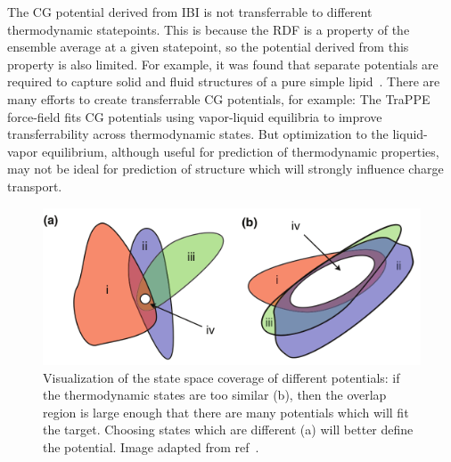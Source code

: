 The CG potential derived from IBI is not transferrable to different thermodynamic statepoints.
This is because the RDF is a property of the ensemble average at a given statepoint, so the potential derived from this property is also limited.
For example, it was found that separate potentials are required to capture solid and fluid structures of a pure simple lipid~\cite{Hadley2010a}.
There are many efforts to create transferrable CG potentials, for example:
The TraPPE force-field fits CG potentials using vapor-liquid equilibria to improve transferrability across thermodynamic states\cite{Maerzke2011}.
But optimization to the liquid-vapor equilibrium, although useful for prediction of thermodynamic properties, may not be ideal for prediction of structure which will strongly influence charge transport.

\begin{figure}
    \centering
    \includegraphics[width=\linewidth]{images/moorefig.pdf}
    \caption{Visualization of the state space coverage of different potentials: if the thermodynamic states are too similar (b), then the overlap region is large enough that there are many potentials which will fit the target. Choosing states which are different (a) will better define the potential. Image adapted from ref~\cite{Moore2014}.}\label{moore}
\end{figure}

